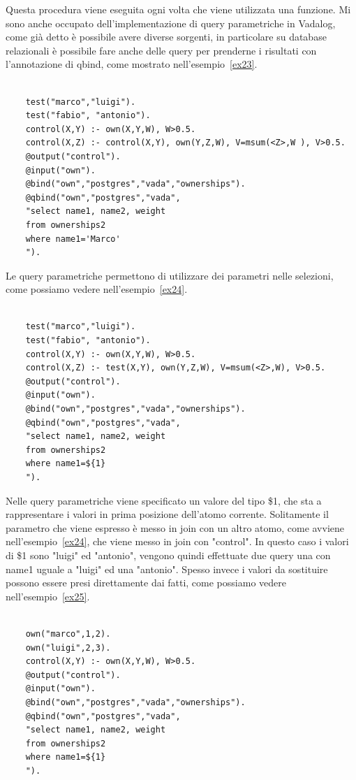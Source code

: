 Questa procedura viene eseguita ogni volta che viene utilizzata una funzione. \newline \newline
Mi sono anche occupato dell'implementazione di query parametriche in Vadalog, come già detto è possibile avere diverse sorgenti, in particolare su database relazionali è possibile fare anche delle query per prenderne i risultati con l'annotazione di qbind, come mostrato nell'esempio~\ref{ex23}.
\begin{example}\label{ex23}
\normalfont
{}
	\begin{lstlisting}
		
	test("marco","luigi").
	test("fabio", "antonio").
	control(X,Y) :- own(X,Y,W), W>0.5.
	control(X,Z) :- control(X,Y), own(Y,Z,W), V=msum(<Z>,W ), V>0.5.
	@output("control").
	@input("own").
	@bind("own","postgres","vada","ownerships").
	@qbind("own","postgres","vada",
	"select name1, name2, weight 
	from ownerships2
	where name1='Marco'
	").
	\end{lstlisting}
\end{example}
Le query parametriche permettono di utilizzare dei parametri nelle selezioni, come possiamo vedere nell'esempio~\ref{ex24}.
\begin{example}\label{ex24}
	\normalfont
	\begin{lstlisting}
	
	test("marco","luigi").
	test("fabio", "antonio").
	control(X,Y) :- own(X,Y,W), W>0.5.
	control(X,Z) :- test(X,Y), own(Y,Z,W), V=msum(<Z>,W), V>0.5.
	@output("control").
	@input("own").
	@bind("own","postgres","vada","ownerships").
	@qbind("own","postgres","vada",
	"select name1, name2, weight 
	from ownerships2
	where name1=${1}
	").
	\end{lstlisting}
\end{example}
Nelle query parametriche viene specificato un valore del tipo \${1}, che sta a rappresentare i valori in prima posizione dell'atomo corrente. Solitamente il parametro che viene espresso è messo in join con un altro atomo, come avviene nell'esempio~\ref{ex24}, che viene messo in join con "control". In questo caso i valori di \${1} sono "luigi" ed "antonio", vengono quindi effettuate due query una con name1 uguale a "luigi" ed una "antonio". \newline
Spesso invece i valori da sostituire possono essere presi direttamente dai fatti, come possiamo vedere nell'esempio~\ref{ex25}.
\begin{example}\label{ex25}
	\normalfont
	\begin{lstlisting}
	
	own("marco",1,2).
	own("luigi",2,3).
	control(X,Y) :- own(X,Y,W), W>0.5.
	@output("control").
	@input("own").
	@bind("own","postgres","vada","ownerships").
	@qbind("own","postgres","vada",
	"select name1, name2, weight 
	from ownerships2
	where name1=${1}
	").
	\end{lstlisting}
\end{example}
